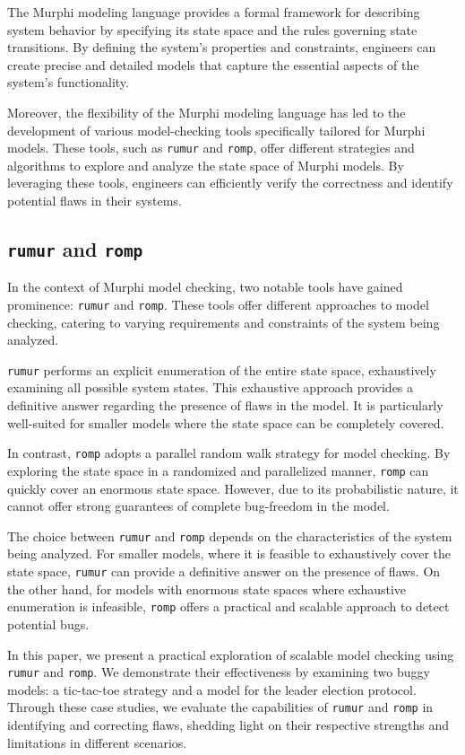 The Murphi modeling language provides a formal framework for describing system
behavior by specifying its state space and the rules governing state
transitions.
By defining the system's properties and constraints, engineers can create
precise and detailed models that capture the essential aspects of the system's
functionality.

Moreover, the flexibility of the Murphi modeling language has led to the
development of various model-checking tools specifically tailored for Murphi
models.
These tools, such as \texttt{rumur} and \texttt{romp}, offer different
strategies and algorithms to explore and analyze the state space of Murphi
models.
By leveraging these tools, engineers can efficiently verify the correctness
and identify potential flaws in their systems.

\subsection{\texttt{rumur} and \texttt{romp}}\label{subsec:rumur-and-romp}

In the context of Murphi model checking, two notable tools have gained
prominence: \texttt{rumur} and \texttt{romp}.
These tools offer different approaches to model checking,
catering to varying requirements and constraints of the system being analyzed.

\texttt{rumur} performs an explicit enumeration of the entire state space,
exhaustively examining all possible system states.
This exhaustive approach provides a definitive answer regarding the presence of
flaws in the model.
It is particularly well-suited for smaller models where the state space can be
completely covered.

In contrast, \texttt{romp} adopts a parallel random walk strategy for model
checking.
By exploring the state space in a randomized and parallelized manner,
\texttt{romp} can quickly cover an enormous state space.
However, due to its probabilistic nature, it cannot offer strong guarantees of
complete bug-freedom in the model.

The choice between \texttt{rumur} and \texttt{romp} depends on the
characteristics of the system being analyzed.
For smaller models, where it is feasible to exhaustively cover the state space,
\texttt{rumur} can provide a definitive answer on the presence of flaws.
On the other hand, for models with enormous state spaces where exhaustive
enumeration is infeasible, \texttt{romp} offers a practical and scalable
approach to detect potential bugs.

In this paper, we present a practical exploration of scalable model checking
using \texttt{rumur} and \texttt{romp}.
We demonstrate their effectiveness by examining two buggy models:
a tic-tac-toe strategy and a model for the leader election protocol.
Through these case studies, we evaluate the capabilities of
\texttt{rumur} and \texttt{romp} in identifying and correcting flaws,
shedding light on their respective strengths and limitations in different
scenarios.
